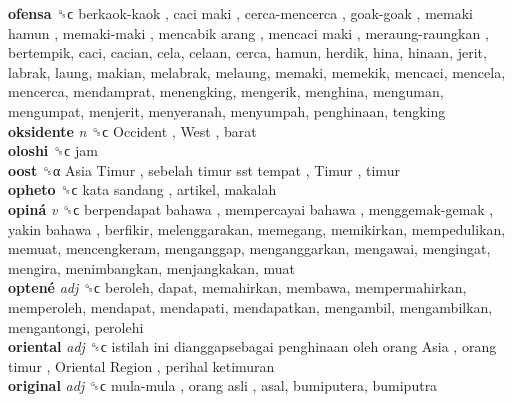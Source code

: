 \textbf{ofensa} ␝ϲ   berkaok-kaok ,  caci maki ,  cerca-mencerca ,  goak-goak ,  memaki hamun ,  memaki-maki ,  mencabik arang ,  mencaci maki ,  meraung-raungkan , bertempik, caci, cacian, cela, celaan, cerca, hamun, herdik, hina, hinaan, jerit, labrak, laung, makian, melabrak, melaung, memaki, memekik, mencaci, mencela, mencerca, mendamprat, menengking, mengerik, menghina, menguman, mengumpat, menjerit, menyeranah, menyumpah, penghinaan, tengking  \\
\textbf{oksidente} \emph{n}  ␝ϲ   Occident ,  West , barat  \\
\textbf{oloshi} ␝ϲ  jam  \\
\textbf{oost} ␝α   Asia Timur ,  sebelah timur sst tempat ,  Timur , timur  \\
\textbf{opheto} ␝ϲ   kata sandang , artikel, makalah  \\
\textbf{opiná} \emph{v}  ␝ϲ   berpendapat bahawa ,  mempercayai bahawa ,  menggemak-gemak ,  yakin bahawa , berfikir, melenggarakan, memegang, memikirkan, mempedulikan, memuat, mencengkeram, menganggap, menganggarkan, mengawai, mengingat, mengira, menimbangkan, menjangkakan, muat  \\
\textbf{optené} \emph{adj}  ␝ϲ  beroleh, dapat, memahirkan, membawa, mempermahirkan, memperoleh, mendapat, mendapati, mendapatkan, mengambil, mengambilkan, mengantongi, perolehi  \\
\textbf{oriental} \emph{adj}  ␝ϲ   istilah ini dianggapsebagai penghinaan oleh orang Asia ,  orang timur ,  Oriental Region ,  perihal ketimuran   \\
\textbf{original} \emph{adj}  ␝ϲ   mula-mula ,  orang asli , asal, bumiputera, bumiputra  \\
